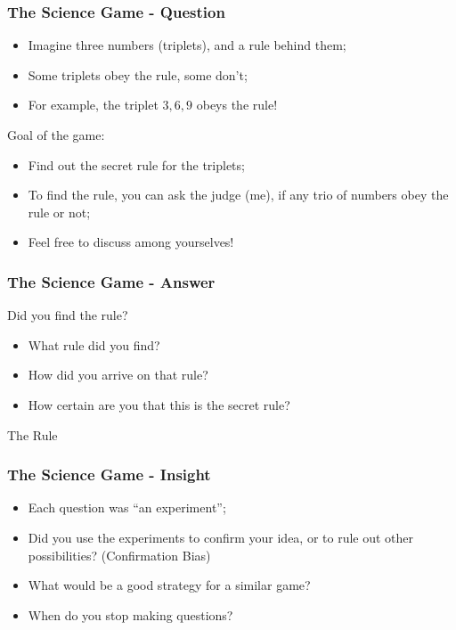 \documentclass{beamer}
\begin{document}
\begin{frame}
  \frametitle{The Science Game - Question}
  \begin{block}{}
    \begin{itemize}
    \item Imagine three numbers (triplets), and a rule behind them;
    \item Some triplets obey the rule, some don't;
    \item For example, the triplet ${3,6,9}$ obeys the rule!
    \end{itemize}
  \end{block}

  \begin{block}{Goal of the game:}
    \begin{itemize}
    \item Find out the secret rule for the triplets;
    \item To find the rule, you can ask the judge (me), if any trio of
      numbers obey the rule or not;
    \item Feel free to discuss among yourselves!
    \end{itemize}
  \end{block}
\end{frame}

\begin{frame}
  \frametitle{The Science Game - Answer}

  Did you find the rule?
  \begin{itemize}
    \item What rule did you find?
    \item How did you arrive on that rule?
    \item How certain are you that this is the secret rule?
  \end{itemize}
  \bigskip

  \begin{block}{The Rule}
  \end{block}
\end{frame}

\begin{frame}
  \frametitle{The Science Game - Insight}
  \begin{itemize}
  \item Each question was ``an experiment'';
  \item Did you use the experiments to confirm your idea, or to rule
    out other possibilities? (Confirmation Bias)
  \item What would be a good strategy for a similar game?
  \item When do you stop making questions?
  \end{itemize}
\end{frame}
\end{document}
